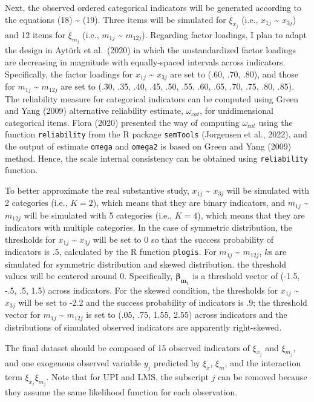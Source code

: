 \documentclass[
  man]{apa6}
\begin{document}
Next, the observed ordered categorical indicators will be generated according to the equations (18) \textasciitilde{} (19). Three items will be simulated for \(\xi_{x_{j}}\) (i.e., \(x_{1j}\) \textasciitilde{} \(x_{3j}\)) and 12 items for \(\xi_{m_{j}}\) (i.e., \(m_{1j}\) \textasciitilde{} \(m_{12j}\)). Regarding factor loadings, I plan to adapt the design in Aytürk et al.~(2020) in which the unstandardized factor loadings are decreasing in magnitude with equally-spaced intervals across indicators. Specifically, the factor loadings for \(x_{1j}\) \textasciitilde{} \(x_{3j}\) are set to (.60, .70, .80), and those for \(m_{1j}\) \textasciitilde{} \(m_{12j}\) are set to (.30, .35, .40, .45, .50, .55, .60, .65, .70, .75, .80, .85). The reliability measure for categorical indicators can be computed using Green and Yang (2009) alternative reliability estimate, \(\omega_{cat}\), for unidimensional categorical items. Flora (2020) presented the way of computing \(\omega_{cat}\) using the function \texttt{reliability} from the R package \texttt{semTools} (Jorgensen et al., 2022), and the output of estimate \texttt{omega} and \texttt{omega2} is based on Green and Yang (2009) method. Hence, the scale internal consistency can be obtained using \texttt{reliability} function.

To better approximate the real substantive study, \(x_{1j}\) \textasciitilde{} \(x_{3j}\) will be simulated with 2 categories (i.e., \(K = 2\)), which means that they are binary indicators, and \(m_{1j}\) \textasciitilde{} \(m_{12j}\) will be simulated with 5 categories (i.e., \(K = 4\)), which means that they are indicators with multiple categories. In the case of symmetric distribution, the thresholds for \(x_{1j}\) \textasciitilde{} \(x_{3j}\) will be set to 0 so that the success probability of indicators is .5, calculated by the R function \texttt{plogis}. For \(m_{1j}\) \textasciitilde{} \(m_{12j}\), \(k\)s are simulated for symmetric distribution and skewed distribution.
the threshold values will be centered around 0. Specifically, \(\mathbf{\beta_{m_{1}}}\) is a threshold vector of (-1.5, -.5, .5, 1.5) across indicators. For the skewed condition, the thresholds for \(x_{1j}\) \textasciitilde{} \(x_{3j}\) will be set to -2.2 and the success probability of indicators is .9; the threshold vector for \(m_{1j}\) \textasciitilde{} \(m_{12j}\) is set to (.05, .75, 1.55, 2.55) across indicators and the distributions of simulated observed indicators are apparently right-skewed.

The final dataset should be composed of 15 observed indicators of \(\xi_{x_{j}}\) and \(\xi_{m_{j}}\), and one exogenous observed variable \(y_{j}\) predicted by \(\xi_{x}\), \(\xi_{m}\), and the interaction term \(\xi_{x_{j}}\xi_{m_{j}}\). Note that for UPI and LMS, the subscript \(j\) can be removed because they assume the same likelihood function for each observation.
\end{document}
